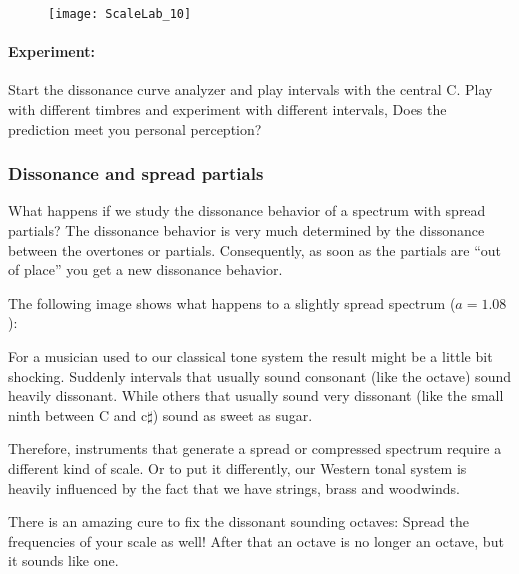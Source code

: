 \begin{figure}[h]
\centering
\texttt{[image: ScaleLab\_10]}
\end{figure}

\paragraph{Experiment:}
Start the dissonance curve analyzer and play intervals with the central C. Play with different timbres and experiment with different intervals, Does the prediction meet you personal perception?


\subsubsection{Dissonance and spread partials}
What happens if we study the dissonance behavior of a spectrum with spread partials? The dissonance behavior is very much determined by the dissonance between the overtones or partials. Consequently, as soon as the partials are ``out of place'' you get a new dissonance behavior.

The following image shows what happens to a slightly spread spectrum ($a=1.08$):

\begin{figure}[h]
\centering
{}
\end{figure}

For a musician used to our classical tone system the result might be a little bit shocking. Suddenly intervals that usually sound consonant (like the octave) sound heavily dissonant. While others that usually sound very dissonant (like the small ninth between C and c$\sharp$) sound as sweet as sugar.

Therefore, instruments that generate a spread or compressed spectrum require a different kind of scale. Or to put it differently, our Western tonal system is heavily influenced by the fact that we have strings, brass and woodwinds.

There is an amazing cure to fix the dissonant sounding octaves: Spread the frequencies of your scale as well! After that an octave is no longer an octave, but it sounds like one.


